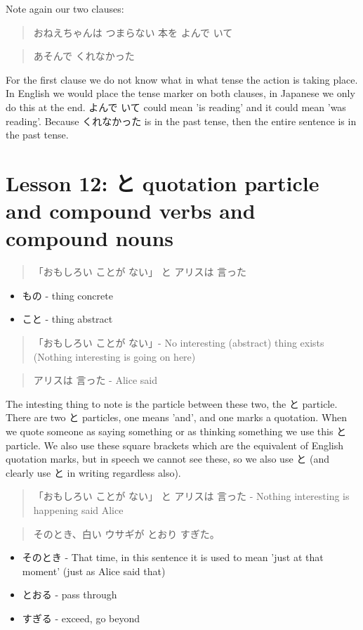 \documentclass[11pt]{article}
\begin{document}
Note again our two clauses:
\begin{quote}
おねえちゃんは つまらない 本を よんで いて
\end{quote}
\begin{quote}
あそんで くれなかった
\end{quote}
For the first clause we do not know what in what tense the action is taking place. In English we would place the tense marker on both clauses, in Japanese we only do this at the end. よんで いて could mean 'is reading' and it could mean 'was reading'. Because くれなかった is in the past tense, then the entire sentence is in the past tense.
\section{Lesson 12: と quotation particle and compound verbs and compound nouns}
\label{sec:org455187d}
\begin{quote}
「おもしろい ことが ない」 と アリスは 言った
\end{quote}
\begin{itemize}
\item もの - thing concrete
\item こと - thing abstract
\end{itemize}

\begin{quote}
「おもしろい ことが ない」- No interesting (abstract) thing exists (Nothing interesting is going on here)
\end{quote}
\begin{quote}
アリスは 言った - Alice said
\end{quote}
The intesting thing to note is the particle between these two, the と particle. There are two と particles, one means 'and', and one marks a quotation. When we quote someone as saying something or as thinking something we use this と particle. We also use these square brackets which are the equivalent of English quotation marks, but in speech we cannot see these, so we also use と (and clearly use と in writing regardless also).
\begin{quote}
「おもしろい ことが ない」 と アリスは 言った - Nothing interesting is happening said Alice
\end{quote}

\begin{quote}
そのとき、白い ウサギが とおり すぎた。
\end{quote}
\begin{itemize}
\item そのとき - That time, in this sentence it is used to mean 'just at that moment' (just as Alice said that)
\item とおる - pass through
\item すぎる - exceed, go beyond
\end{itemize}
\end{document}
